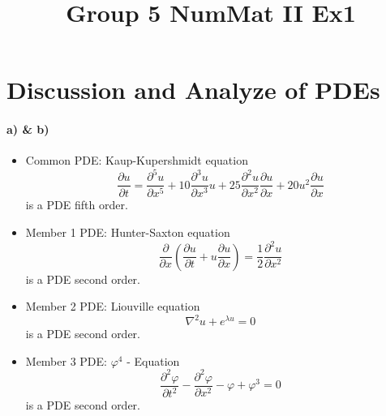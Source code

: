 \documentclass[a4paper]{article}
\title{Group 5 NumMat II Ex1}
\begin{document}
	\begin{titlepage}
		\maketitle
		\thispagestyle{empty}
	\end{titlepage}
	\newpage


\section{Discussion and Analyze of PDEs}

\paragraph{a) \& b)}
\begin{itemize}
	\item Common PDE: Kaup-Kupershmidt equation
		\begin{equation}
			\frac{\partial u }{\partial t} = \frac{\partial ^5 u}{\partial x^5} + 10 \frac{\partial ^3 u}{\partial x^3} u + 25 \frac{\partial ^2 u}{\partial x^2} \frac{\partial u}{\partial x} + 20 u^2 \frac{\partial u}{\partial x}
		\end{equation}
		\hspace{2.4cm} is a PDE fifth order.
	
	\item Member 1 PDE: Hunter-Saxton equation
		\begin{equation}
			\frac{\partial}{\partial x} \left( \frac{\partial u }{\partial t} + u \frac{\partial u}{\partial x} \right) = \frac{1}{2} \frac{\partial ^2 u}{\partial x^2}
		\end{equation}
		\hspace{2.4cm} is a PDE second order.
	\item Member 2 PDE: Liouville equation
		\begin{equation}
			\nabla ^2 u + e ^{\lambda u} = 0
		\end{equation}
		\hspace{2.4cm} is a PDE second order.
	\item Member 3 PDE: $\varphi ^4$ - Equation
		\begin{equation}
			\frac{\partial ^2 \varphi}{\partial t ^2} - \frac{\partial ^2 \varphi}{\partial x ^2} - \varphi + \varphi ^3 = 0
		\end{equation}
		\hspace{2.4cm} is a PDE second order.
		
\end{itemize}
\end{document}
